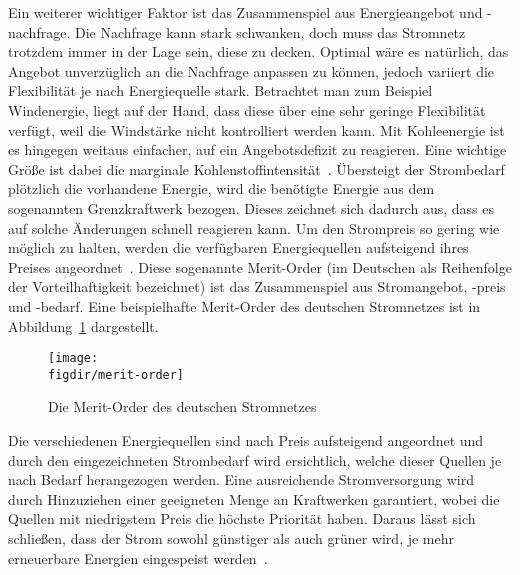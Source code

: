 Ein weiterer wichtiger Faktor ist das Zusammenspiel aus Energieangebot und -nachfrage.
Die Nachfrage kann stark schwanken, doch muss das Stromnetz trotzdem immer in der Lage sein, diese zu decken.
Optimal wäre es natürlich, das Angebot unverzüglich an die Nachfrage anpassen zu können, jedoch variiert die Flexibilität je nach Energiequelle stark.
Betrachtet man zum Beispiel Windenergie, liegt auf der Hand, dass diese über eine sehr geringe Flexibilität verfügt, weil die Windstärke nicht kontrolliert werden kann.
Mit Kohleenergie ist es hingegen weitaus einfacher, auf ein Angebotsdefizit zu reagieren.
Eine wichtige Größe ist dabei die marginale Kohlenstoffintensität~\cite{GreenSoftwareFoundation.2022}.
Übersteigt der Strombedarf plötzlich die vorhandene Energie, wird die benötigte Energie aus dem sogenannten Grenzkraftwerk bezogen.
Dieses zeichnet sich dadurch aus, dass es auf solche Änderungen schnell reagieren kann.
Um den Strompreis so gering wie möglich zu halten, werden die verfügbaren Energiequellen aufsteigend ihres Preises angeordnet~\cite{Corradi.20231207T10:48:51.000Z}.
Diese sogenannte Merit-Order (im Deutschen als Reihenfolge der Vorteilhaftigkeit bezeichnet) ist das Zusammenspiel aus Stromangebot, -preis und -bedarf.
Eine beispielhafte Merit-Order des deutschen Stromnetzes ist in Abbildung~\ref{FIG:merit-order} dargestellt.
\begin{figure}
 \caption[Merit-Order des deutschen Stromnetzes]{Die Merit-Order des deutschen Stromnetzes~\cite{Gro.5.10.2022}}
 {\texttt{[image: \\figdir/merit-order]}}
 \label{FIG:merit-order}
\end{figure}
Die verschiedenen Energiequellen sind nach Preis aufsteigend angeordnet und durch den eingezeichneten Strombedarf wird ersichtlich, welche dieser Quellen je nach Bedarf herangezogen werden.
Eine ausreichende Stromversorgung wird durch Hinzuziehen einer geeigneten Menge an Kraftwerken garantiert, wobei die Quellen mit niedrigstem Preis die höchste Priorität haben.
Daraus lässt sich schließen, dass der Strom sowohl günstiger als auch grüner wird, je mehr erneuerbare Energien eingespeist werden~\cite{Gro.5.10.2022}.

